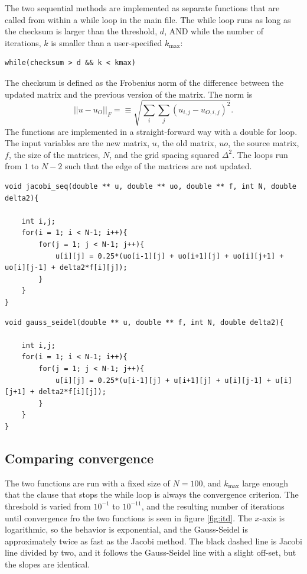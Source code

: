 The two sequential methods are implemented as separate functions that are called from within a while loop in the main file. The while loop runs as long as the checksum is larger than the threshold, $d$, AND while the number of iterations, $k$ is smaller than a user-specified $k_\mathrm{max}$:
\begin{lstlisting}
while(checksum > d && k < kmax)
\end{lstlisting}
The checksum is defined as the Frobenius norm of the difference between the updated matrix and the previous version of the matrix. The norm is
\begin{equation}
||u-u_O||_F = \equiv \sqrt{\sum_i\sum_j (u_{i,j}-u_{O, i,j})^2}.
\end{equation}
The functions are implemented in a straight-forward way with a double for loop. The input variables are the new matrix, $u$, the old matrix, $uo$, the source matrix, $f$, the size of the matrices, $N$, and the grid spacing squared $\Delta ^2$. The loops run from $1$ to $N-2$ such that the edge of the matrices are not updated.
\begin{lstlisting}[caption = Implementation of the sequential Jacobi iterative process]
void jacobi_seq(double ** u, double ** uo, double ** f, int N, double delta2){

	int i,j;
	for(i = 1; i < N-1; i++){
		for(j = 1; j < N-1; j++){
			u[i][j] = 0.25*(uo[i-1][j] + uo[i+1][j] + uo[i][j+1] + uo[i][j-1] + delta2*f[i][j]);
		}
	}
}
\end{lstlisting}

\begin{lstlisting}[caption = Implementation of the sequential Gauss-Seidel iterative process]
void gauss_seidel(double ** u, double ** f, int N, double delta2){

	int i,j;
	for(i = 1; i < N-1; i++){
		for(j = 1; j < N-1; j++){
			u[i][j] = 0.25*(u[i-1][j] + u[i+1][j] + u[i][j-1] + u[i][j+1] + delta2*f[i][j]);
		}
	}
}
\end{lstlisting}

\subsection{Comparing convergence}
The two functions are run with a fixed size of $N=100$, and $k_\mathrm{max}$ large enough that the clause that stops the while loop is always the convergence criterion. The threshold is varied from $10^{-1}$ to $10^{-11}$, and the resulting number of iterations until convergence fro the two functions is seen in figure \ref{fig:itd}. The $x$-axis is logarithmic, so the behavior is exponential, and the Gauss-Seidel is approximately twice as fast as the Jacobi method. The black dashed line is Jacobi line divided by two, and it follows the Gauss-Seidel line with a slight off-set, but the slopes are identical.


